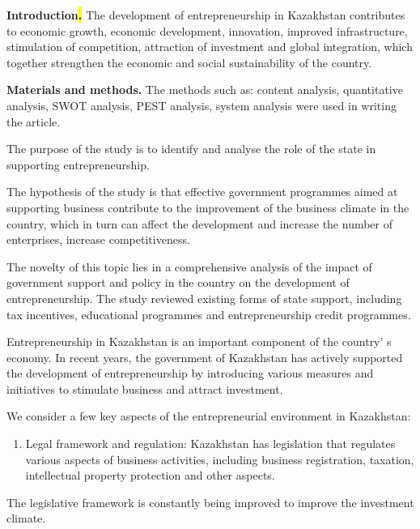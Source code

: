 {\bfseries Introduction\hl{. }}The development of entrepreneurship in
Kazakhstan contributes to economic growth, economic development,
innovation, improved infrastructure, stimulation of competition,
attraction of investment and global integration, which together
strengthen the economic and social sustainability of the country.

{\bfseries Materials and methods.} The methods such as: content analysis,
quantitative analysis, SWOT analysis, PEST analysis, system analysis
were used in writing the article.

The purpose of the study is to identify and analyse the role of the
state in supporting entrepreneurship.

The hypothesis of the study is that effective government programmes
aimed at supporting business contribute to the improvement of the
business climate in the country, which in turn can affect the
development and increase the number of enterprises, increase
competitiveness.

The novelty of this topic lies in a comprehensive analysis of the impact
of government support and policy in the country on the development of
entrepreneurship. The study reviewed existing forms of state support,
including tax incentives, educational programmes and entrepreneurship
credit programmes.

Entrepreneurship in Kazakhstan is an important component of the
country' s economy. In recent years, the government of
Kazakhstan has actively supported the development of entrepreneurship by
introducing various measures and initiatives to stimulate business and
attract investment.

We consider a few key aspects of the entrepreneurial environment in
Kazakhstan:

\begin{enumerate}
\def\labelenumi{\arabic{enumi}.}
\item
  Legal framework and regulation: Kazakhstan has legislation that
  regulates various aspects of business activities, including business
  registration, taxation, intellectual property protection and other
  aspects.
\end{enumerate}

The legislative framework is constantly being improved to improve the
investment climate.

